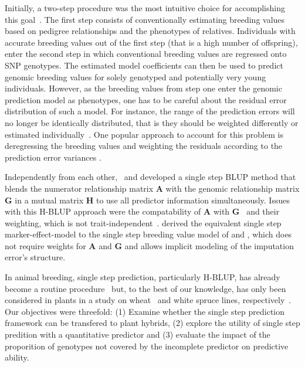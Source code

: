 \documentclass[12pt,titlepage]{article}
\begin{document}
Initially, a two-step procedure was the most intuitive choice for accomplishing
this goal~\cite{VanRaden2009}.
The first step consists of conventionally estimating breeding values based on
pedigree relationships and the phenotypes of relatives.
Individuals with accurate breeding values out of the first step (that is a
high number of offspring), enter the second step in which conventional breeding
values are regressed onto SNP genotypes.
The estimated model coefficients can then be used to predict genomic breeding 
values for solely genotyped and potentially very young individuals.
However, as the breeding values from step one enter the genomic prediction
model as phenotypes, one has to be careful about the residual error
distribution of such a model.
For instance, the range of the prediction errors will no longer be identically
distributed, that is they should be weighted differently or estimated 
individually~\cite{Aguilar2010}.
One popular approach to account for this problem is deregressing the breeding
values and weighting the residuals according to the prediction error variances
\cite{Garrick2009}.

Independently from each other,~ and
 developed a single step BLUP method that blends the 
numerator relationship matrix $\mathbf{A}$ with the genomic relationship matrix
$\mathbf{G}$ in a mutual matrix $\mathbf{H}$ to use all predictor information
simultaneously.
Issues with this H-BLUP approach were the compatability of $\mathbf{A}$ with
$\mathbf{G}$~\cite{Christensen2012} and their weighting, which is not
trait-independent~\cite{Vitezica2011,Ashraf2016}.
 derived the equivalent single step marker-effect-model to 
the single step breeding value model of  and 
, which does not require weights for $\mathbf{A}$ and 
$\mathbf{G}$ and allows implicit modeling of the imputation error's structure.


In animal breeding, single step prediction, particularly H-BLUP, has already 
become a routine procedure~\cite{Legarra2014} but, to the best of our knowledge, 
has only been considered in plants in a study on wheat~\cite{Ashraf2016} and
white spruce lines, respectively~\cite{Ratcliffe2017}.
Our objectives were threefold: (1) Examine whether the single step prediction
framework can be transfered to plant hybrids, (2) explore the utility of single 
step predition with a quantitative predictor and (3) evaluate the impact of the
proporition of genotypes not covered by the incomplete predictor on predictive
ability.
\end{document}
